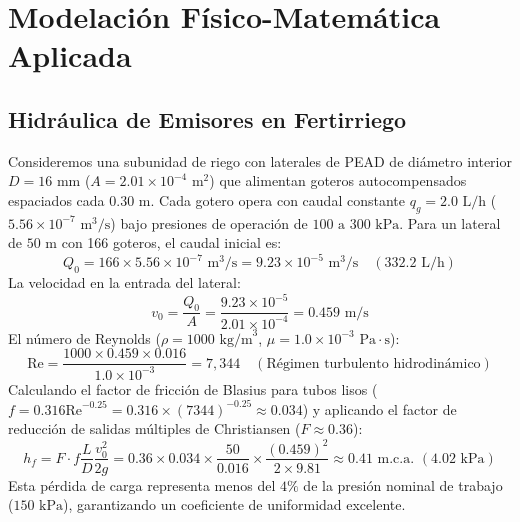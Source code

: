 \documentclass[12pt,spanish,letterpaper,oneside]{article}
\begin{document}
\section{Modelación Físico-Matemática Aplicada}

\subsection{Hidráulica de Emisores en Fertirriego}
Consideremos una subunidad de riego con laterales de PEAD de diámetro interior $D = 16\text{ mm}$ ($A = 2.01 \times 10^{-4}\text{ m}^2$) que alimentan goteros autocompensados espaciados cada $0.30\text{ m}$. Cada gotero opera con caudal constante $q_g = 2.0\text{ L/h}$ ($5.56 \times 10^{-7}\text{ m}^3\text{/s}$) bajo presiones de operación de $100\text{ a }300\text{ kPa}$.
Para un lateral de $50\text{ m}$ con 166 goteros, el caudal inicial es:
\begin{equation}
    Q_0 = 166 \times 5.56 \times 10^{-7}\text{ m}^3\text{/s} = 9.23 \times 10^{-5}\text{ m}^3\text{/s} \quad (332.2\text{ L/h})
\end{equation}
La velocidad en la entrada del lateral:
\begin{equation}
    v_0 = \frac{Q_0}{A} = \frac{9.23 \times 10^{-5}}{2.01 \times 10^{-4}} = 0.459\text{ m/s}
\end{equation}
El número de Reynolds ($\rho = 1000\text{ kg/m}^3$, $\mu = 1.0 \times 10^{-3}\text{ Pa}\cdot\text{s}$):
\begin{equation}
    \mathrm{Re} = \frac{1000 \times 0.459 \times 0.016}{1.0 \times 10^{-3}} = 7,344 \quad (\text{Régimen turbulento hidrodinámico})
\end{equation}
Calculando el factor de fricción de Blasius para tubos lisos ($f = 0.316 \mathrm{Re}^{-0.25} = 0.316 \times (7344)^{-0.25} \approx 0.034$) y aplicando el factor de reducción de salidas múltiples de Christiansen ($F \approx 0.36$):
\begin{equation}
    h_f = F \cdot f \frac{L}{D} \frac{v_0^2}{2g} = 0.36 \times 0.034 \times \frac{50}{0.016} \times \frac{(0.459)^2}{2 \times 9.81} \approx 0.41\text{ m.c.a. } (4.02\text{ kPa})
\end{equation}
Esta pérdida de carga representa menos del $4\%$ de la presión nominal de trabajo ($150\text{ kPa}$), garantizando un coeficiente de uniformidad excelente.
\end{document}
